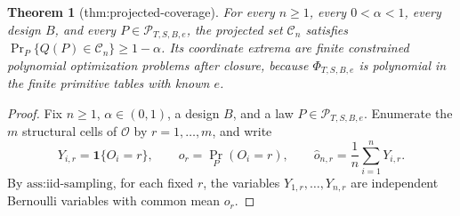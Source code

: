 \documentclass{article}
\newtheorem{theorem}{Theorem}
\begin{document}
\begin{theorem}[thm:projected-coverage]\label{thm:projected-coverage}
For every \(n\ge1\), every \(0<\alpha<1\), every design \(B\), and every \(P\in\mathcal P_{T,S,B,e}\), the projected set \(\mathcal C_n\) satisfies \(\Pr_P\{Q(P)\in\mathcal C_n\}\ge1-\alpha\). Its coordinate extrema are finite constrained polynomial optimization problems after closure, because \(\Phi_{T,S,B,e}\) is polynomial in the finite primitive tables with known \(e\).
\end{theorem}
\begin{proof}
Fix \(n\geq 1\), \(\alpha\in(0,1)\), a design \(B\), and a law \(P\in\mathcal P_{T,S,B,e}\).  Enumerate the \(m\) structural cells of \(\mathcal O\) by \(r=1,\ldots,m\), and write
\[
Y_{i,r}=\mathbf 1\{O_i=r\},\qquad
o_r=\Pr_P(O_i=r),\qquad
\widehat o_{n,r}=\frac1n\sum_{i=1}^nY_{i,r}.
\]
By \(\text{ass:iid-sampling}\), for each fixed \(r\), the variables \(Y_{1,r},\ldots,Y_{n,r}\) are independent Bernoulli variables with common mean \(o_r\).


\end{proof}
\end{document}
